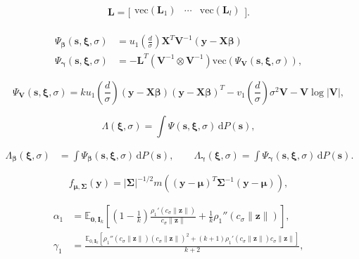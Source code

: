 \documentclass[10pt,a4paper]{amsart}
\newcommand{\bI}{\mathbf{I}}
\newcommand{\bL}{\mathbf{L}}
\newcommand{\bSigma}{\mathbf{\Sigma}}
\newcommand{\bV}{\mathbf{V}}
\newcommand{\bX}{\mathbf{X}}
\newcommand{\bbeta}{\bm\beta}
\newcommand{\bgamma}{\bm\gamma}
\newcommand{\bmu}{\bm\mu}
\newcommand{\bs}{\mathbf{s}}
\newcommand{\bxi}{\bm\xi}
\newcommand{\by}{\mathbf{y}}
\newcommand{\bz}{\mathbf{z}}
\newcommand{\dd}{\mathrm{d}}
\newcommand{\vc}{\mathrm{vec}}
\begin{document}
\begin{equation}
\label{def:L}
\bL
=
\Big[
  \begin{array}{ccc}
    \vc\left(\bL_1\right)
 & \cdots &     \vc\left(\bL_l\right) \\
  \end{array}
\Big].
\end{equation}

\begin{equation}
\label{def:Psi linear}
\begin{split}
\Psi_{\bbeta}(\bs,\bxi,\sigma)
&=
u_1\left(\frac{d}{\sigma}\right)
\bX^T\bV^{-1}(\by-\bX\bbeta)\\
\Psi_{\bgamma}(\bs,\bxi,\sigma)
&=
-\bL^T
\left(
\bV^{-1}
\otimes
\bV^{-1}
\right)
\vc\left(
\Psi_\bV(\bs,\bxi,\sigma)
\right),
\end{split}
\end{equation}

\begin{equation}
\label{def:PsiV}
\Psi_\bV(\bs,\bxi,\sigma)
=
k
u_1\left(\frac{d}{\sigma}\right)
(\by-\bX\bbeta)(\by-\bX\bbeta)^T
-
v_1\left(\frac{d}{\sigma}\right)
\sigma^2\bV
-
\bV
\log|\bV|,
\end{equation}

\begin{equation}
\label{def:Lambda}
\Lambda(\bxi,\sigma)
=
\int \Psi(\bs,\bxi,\sigma)\,\dd P(\bs),
\end{equation}

\begin{equation}
\label{def:Lambda-beta-gamma}
\begin{split}
\Lambda_{\bbeta}(\bxi,\sigma)
&=
\int
\Psi_{\bbeta}(\bs,\bxi,\sigma)\,\dd P(\bs),
\qquad
\Lambda_{\bgamma}(\bxi,\sigma)
=
\int
\Psi_{\bgamma}(\bs,\bxi,\sigma)\,\dd P(\bs).
\end{split}
\end{equation}

\begin{equation}
\label{eq:elliptical}
f_{\bmu,\bSigma}(\by)
=
|\bSigma|^{-1/2}
m\left(
(\by-\bmu)^T
\bSigma^{-1}
(\by-\bmu)
\right),
\end{equation}

\begin{equation}
\label{def:alpha1-gamma1}
\begin{split}
\alpha_1
&=
\mathbb{E}_{\mathbf{0},\bI_k}
\left[
\left(
1-\frac{1}{k}
\right)
\frac{\rho_1'\left(c_\sigma\|\bz\|\right)}{c_\sigma\|\bz\|}
+
\frac1k
\rho_1''\left(c_\sigma\|\bz\|\right)
\right],\\
\gamma_1
&=
\frac{\mathbb{E}_{0,\mathbf{I}_k}
\left[
\rho_1''(c_\sigma\|\bz\|)(c_\sigma\|\bz\|)^2+(k+1)\rho_1'(c_\sigma\|\bz\|)c_\sigma\|\bz\|
\right]}{k+2},
\end{split}
\end{equation}
\end{document}
